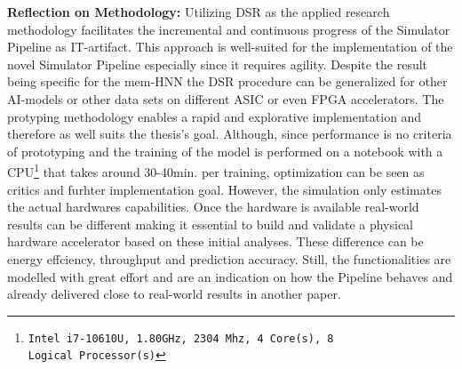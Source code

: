\textbf{Reflection on Methodology:} 
Utilizing \ac{DSR} as the applied research methodology facilitates the incremental and continuous progress of the Simulator Pipeline as \ac{IT}-artifact.
This approach is well-suited for the implementation of the novel Simulator Pipeline especially since it requires agility.
Despite the result being specific for the \ac{mem-HNN} the \ac{DSR} procedure can be generalized for other AI-models or other data sets on different \ac{ASIC} or 
even \ac{FPGA} accelerators. 
The protyping methodology enables a rapid and explorative implementation and therefore as well suits the thesis's goal. 
Although, since performance is no criteria of prototyping and the training of the model is performed on a notebook with a CPU\footnote{\texttt{Intel i7-10610U, 1.80GHz, 2304 Mhz, 4 Core(s), 8 Logical Processor(s)}} that takes around 30-40min. per training,
optimization can be seen as critics and furhter implementation goal.
However, the simulation only estimates the actual hardwares capabilities.
Once the hardware is available real-world results can be different making it essential to build and validate a physical hardware accelerator based on these initial analyses.
These difference can be energy effciency, throughput and prediction accuracy. 
Still, the functionalities are modelled with great effort and are an indication on how the Pipeline behaves and already delivered close to real-world results in another paper.

